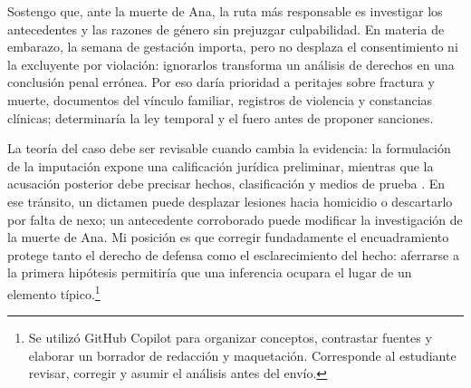 \documentclass[spanish,letterpaper,oneside]{article}
\begin{document}
Sostengo que, ante la muerte de Ana, la ruta más responsable es investigar los antecedentes y las razones de género sin prejuzgar culpabilidad. En materia de embarazo, la semana de gestación importa, pero no desplaza el consentimiento ni la excluyente por violación: ignorarlos transforma un análisis de derechos en una conclusión penal errónea. Por eso daría prioridad a peritajes sobre fractura y muerte, documentos del vínculo familiar, registros de violencia y constancias clínicas; determinaría la ley temporal y el fuero antes de proponer sanciones.

La teoría del caso debe ser revisable cuando cambia la evidencia: la formulación de la imputación expone una calificación jurídica preliminar, mientras que la acusación posterior debe precisar hechos, clasificación y medios de prueba \citep[arts.~211, 311 y 335]{cnppOficial2025}. En ese tránsito, un dictamen puede desplazar lesiones hacia homicidio o descartarlo por falta de nexo; un antecedente corroborado puede modificar la investigación de la muerte de Ana. Mi posición es que corregir fundadamente el encuadramiento protege tanto el derecho de defensa como el esclarecimiento del hecho: aferrarse a la primera hipótesis permitiría que una inferencia ocupara el lugar de un elemento típico.\footnote{Se utilizó GitHub Copilot para organizar conceptos, contrastar fuentes y elaborar un borrador de redacción y maquetación. Corresponde al estudiante revisar, corregir y asumir el análisis antes del envío.}
\end{document}
